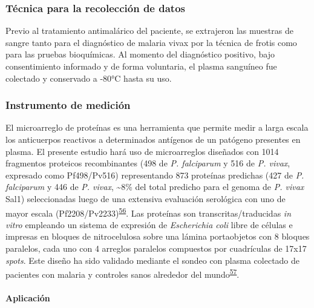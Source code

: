\documentclass[]{article}
\let\oldparagraph\paragraph
\renewcommand{\paragraph}[1]{\oldparagraph{#1}\mbox{}}
\begin{document}
\subsubsection{Técnica para la recolección de
datos}\label{tecnica-para-la-recoleccion-de-datos}

Previo al tratamiento antimalárico del paciente, se extrajeron las
muestras de sangre tanto para el diagnóstico de malaria vivax por la
técnica de frotis como para las pruebas bioquímicas. Al momento del
diagnóstico positivo, bajo consentimiento informado y de forma
voluntaria, el plasma sanguíneo fue colectado y conservado a -80°C hasta
su uso.

\subsubsection{Instrumento de medición}\label{instrumento-de-medicion}

El microarreglo de proteínas es una herramienta que permite medir a
larga escala los anticuerpos reactivos a determinados antígenos de un
patógeno presentes en plasma. El presente estudio hará uso de
microarreglos diseñados con 1014 fragmentos proteicos recombinantes (498
de \emph{P. falciparum} y 516 de \emph{P. vivax}, expresado como
Pf498/Pv516) representando 873 proteínas predichas (427 de \emph{P.
falciparum} y 446 de \emph{P. vivax}, \textasciitilde{}8\% del total
predicho para el genoma de \emph{P. vivax} Sal1) seleccionadas luego de
una extensiva evaluación serológica con uno de mayor escala
(Pf2208/Pv2233)\textsuperscript{\protect\hyperlink{ref-Finney2014}{56}}.
Las proteínas son transcritas/traducidas \emph{in vitro} empleando un
sistema de expresión de \emph{Escherichia coli} libre de células e
impresas en bloques de nitrocelulosa sobre una lámina portaobjetos con 8
bloques paralelos, cada uno con 4 arreglos paralelos compuestos por
cuadrículas de 17x17 \emph{spots}. Este diseño ha sido validado mediante
el sondeo con plasma colectado de pacientes con malaria y controles
sanos alrededor del
mundo\textsuperscript{\protect\hyperlink{ref-King2015FOC}{57}}.

\paragraph{Aplicación}\label{aplicacion}
\end{document}
